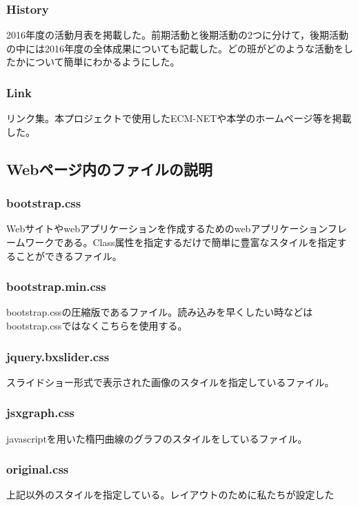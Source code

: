 \documentclass[openany,11pt,papersize]{jsbook}
\begin{document}

\subsubsection{History}
2016年度の活動月表を掲載した。前期活動と後期活動の2つに分けて，後期活動の中には2016年度の全体成果についても記載した。どの班がどのような活動をしたかについて簡単にわかるようにした。


\subsubsection{Link}
リンク集。本プロジェクトで使用したECM-NETや本学のホームページ等を掲載した。


\subsection{Webページ内のファイルの説明}

\subsubsection{bootstrap.css}
Webサイトやwebアプリケーションを作成するためのwebアプリケーションフレームワークである。Class属性を指定するだけで簡単に豊富なスタイルを指定することができるファイル。

\subsubsection{bootstrap.min.css}
bootstrap.cssの圧縮版であるファイル。読み込みを早くしたい時などはbootstrap.cssではなくこちらを使用する。

\subsubsection{jquery.bxslider.css}
スライドショー形式で表示された画像のスタイルを指定しているファイル。

\subsubsection{jsxgraph.css}
javascriptを用いた楕円曲線のグラフのスタイルをしているファイル。

\subsubsection{original.css}
上記以外のスタイルを指定している。レイアウトのために私たちが設定した
\end{document}
